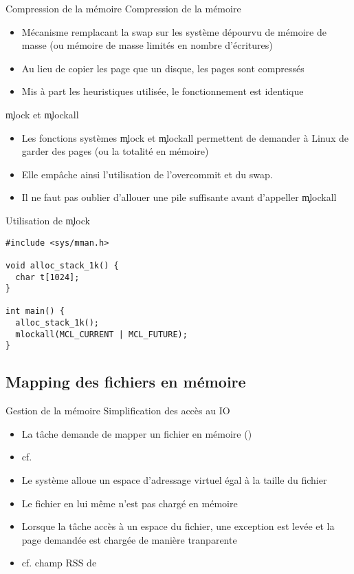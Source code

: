 \begin{frame}[fragile=singleslide]{Compression de la mémoire}
  Compression de la mémoire
  \begin{itemize}
  \item  Mécanisme remplacant  la  swap sur  les  système dépourvu  de
    mémoire  de   masse  (ou  mémoire  de  masse   limités  en  nombre
    d'écritures)
  \item  Au lieu  de copier  les page  que un  disque, les  pages sont
    compressés
  \item Mis  à part les  heuristiques utilisée, le  fonctionnement est
    identique
  \end{itemize}
\end{frame}

\begin{frame}[fragile=singleslide]{\c{mlock}                     et
  \c{mlockall}}
  \begin{itemize}
  \item Les  fonctions systèmes \c{mlock}  et \c{mlockall}
    permettent  de  demander  à  Linux  de garder  des  pages  (ou  la
    totalité en mémoire)
  \item Elle empâche ainsi l'utilisation de l'overcommit et du swap.
  \item  Il ne  faut pas  oublier d'allouer  une pile  suffisante avant
    d'appeller \c{mlockall}
  \end{itemize}
\end{frame}

\begin{frame}[fragile]{Utilisation de \c{mlock}}
\begin{lstlisting}
#include <sys/mman.h>

void alloc_stack_1k() {
  char t[1024];
}

int main() {
  alloc_stack_1k();
  mlockall(MCL_CURRENT | MCL_FUTURE);
}
\end{lstlisting}
\end{frame}

\subsection{Mapping des fichiers en mémoire}

\begin{frame}{Gestion de la mémoire}
  Simplification des accès au IO
  \begin{itemize}
  \item   La  tâche   demande  de   mapper  un   fichier   en  mémoire
    ()
  \item cf. 
  \item  Le système  alloue un  espace d'adressage  virtuel égal  à la
    taille du fichier
  \item Le fichier en lui même n'est pas chargé en mémoire
  \item Lorsque la  tâche accès à un espace  du fichier, une exception
    est levée et la page demandée est chargée de manière tranparente
  \item cf. champ RSS de 
  \end{itemize}
\end{frame}

